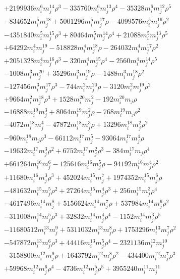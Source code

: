 {\begin{align*}
&+2199936m_i^{6}m_j^{14}\rho^{3}-335760m_i^{6}m_j^{13}\rho^{4}-35328m_i^{6}m_j^{12}\rho^{5}\\
&-834652m_i^{5}m_j^{18}+5001296m_i^{5}m_j^{17}\rho-4099576m_i^{5}m_j^{16}\rho^{2}\\
&-4351840m_i^{5}m_j^{15}\rho^{3}+80464m_i^{5}m_j^{14}\rho^{4}+21088m_i^{5}m_j^{13}\rho^{5}\\
&+64292m_i^{4}m_j^{19}-518828m_i^{4}m_j^{18}\rho-264032m_i^{4}m_j^{17}\rho^{2}\\
&+2051328m_i^{4}m_j^{16}\rho^{3}-320m_i^{4}m_j^{15}\rho^{4}-2560m_i^{4}m_j^{14}\rho^{5}\\
&-1008m_i^{3}m_j^{20}+35296m_i^{3}m_j^{19}\rho-1488m_i^{3}m_j^{18}\rho^{2}\\
&-127456m_i^{3}m_j^{17}\rho^{3}-744m_i^{2}m_j^{20}\rho-3120m_i^{2}m_j^{19}\rho^{2}\\
&+9664m_i^{2}m_j^{18}\rho^{3}+1528m_i^{20}m_j^{2}-192m_i^{20}m_j\rho\\
&-16888m_i^{19}m_j^{3}+8064m_i^{19}m_j^{2}\rho-768m_i^{19}m_j\rho^{2}\\
&-4072m_i^{18}m_j^{4}-47872m_i^{18}m_j^{3}\rho+13296m_i^{18}m_j^{2}\rho^{2}\\
&-960m_i^{18}m_j\rho^{3}-66112m_i^{17}m_j^{5}-93064m_i^{17}m_j^{4}\rho\\
&-19632m_i^{17}m_j^{3}\rho^{2}+6752m_i^{17}m_j^{2}\rho^{3}-384m_i^{17}m_j\rho^{4}\\
&+661264m_i^{16}m_j^{6}-125616m_i^{16}m_j^{5}\rho-94192m_i^{16}m_j^{4}\rho^{2}\\
&+11680m_i^{16}m_j^{3}\rho^{3}+452024m_i^{15}m_j^{7}+1974352m_i^{15}m_j^{6}\rho\\
&-481632m_i^{15}m_j^{5}\rho^{2}+27264m_i^{15}m_j^{4}\rho^{3}+256m_i^{15}m_j^{3}\rho^{4}\\
&-4617496m_i^{14}m_j^{8}+5156624m_i^{14}m_j^{7}\rho+537984m_i^{14}m_j^{6}\rho^{2}\\
&-311008m_i^{14}m_j^{5}\rho^{3}+32832m_i^{14}m_j^{4}\rho^{4}-1152m_i^{14}m_j^{3}\rho^{5}\\
&-11680512m_i^{13}m_j^{9}+5311032m_i^{13}m_j^{8}\rho+1753296m_i^{13}m_j^{7}\rho^{2}\\
&-547872m_i^{13}m_j^{6}\rho^{3}+44416m_i^{13}m_j^{5}\rho^{4}-2321136m_i^{12}m_j^{10}\\
&-3158800m_i^{12}m_j^{9}\rho+1643792m_i^{12}m_j^{8}\rho^{2}-434400m_i^{12}m_j^{7}\rho^{3}\\
&+59968m_i^{12}m_j^{6}\rho^{4}-4736m_i^{12}m_j^{5}\rho^{5}+3955240m_i^{11}m_j^{11}\\

\end{align*}}
